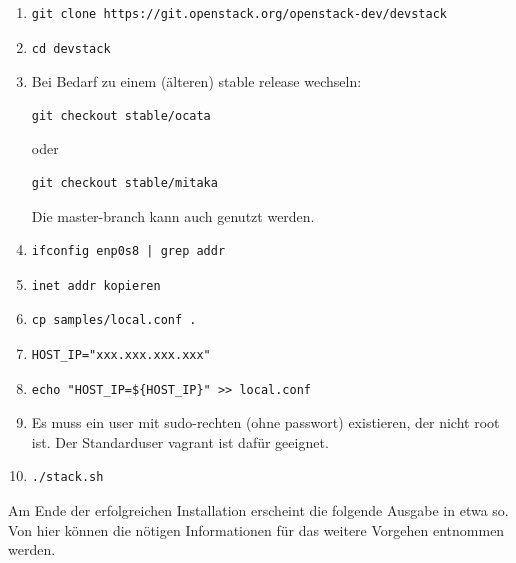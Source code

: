 \documentclass[a4paper,10pt]{article}
\begin{document}
\begin{enumerate}
 \item \begin{verbatim}git clone https://git.openstack.org/openstack-dev/devstack \end{verbatim}
 \item  \begin{verbatim}cd devstack\end{verbatim}
 \item Bei Bedarf zu einem (älteren) stable release wechseln: \begin{verbatim}git checkout stable/ocata\end{verbatim} oder \begin{verbatim}git checkout stable/mitaka\end{verbatim} Die master-branch kann auch genutzt werden.
 \item \begin{verbatim}ifconfig enp0s8 | grep addr\end{verbatim}
 \item \begin{verbatim}inet addr kopieren\end{verbatim}
 \item \begin{verbatim}cp samples/local.conf .\end{verbatim}
 \item \begin{verbatim}HOST_IP="xxx.xxx.xxx.xxx"\end{verbatim}
 \item \begin{verbatim}echo "HOST_IP=${HOST_IP}" >> local.conf\end{verbatim}
 \item Es muss ein user mit sudo-rechten (ohne passwort) existieren, der nicht root ist. Der Standarduser vagrant ist dafür geeignet.
 \item \begin{verbatim}./stack.sh\end{verbatim}
\end{enumerate}

Am Ende der erfolgreichen Installation erscheint die folgende Ausgabe in etwa so.
Von hier können die nötigen Informationen für das weitere Vorgehen entnommen werden.
\end{document}
